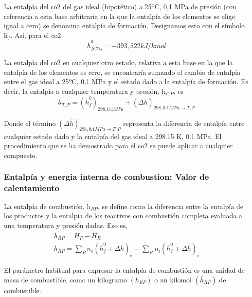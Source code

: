 \par La entalpía del \ac{co2} del gas ideal (hipotético) a 25ºC, 0,1 MPa de presión (con referencia a esta base arbitraria en la que la entalpía de los elementos se elige igual a cero) se denomina entalpía de formación. Designamos esto con el símbolo \=h$_f$. Así, para el \ac{co2}
\begin{equation*}
\bar h^0_{f CO_2} = -393,522 kJ/kmol
\end{equation*}
\par La entalpía del \ac{co2} en cualquier otro estado, relativa a esta base en la que la entalpía de los elementos es cero, se encontraría sumando el cambio de entalpía entre el gas ideal a 25ºC, 0,1 MPa y el estado dado a la entalpía de formación. Es decir, la entalpía a cualquier temperatura y presión, h$_{T, P}$, es
\begin{equation*}
\bar h_{T,P} = (\bar h^0_{f})_{298,0.1MPa} + (\Delta \bar h)_{298,0.1MPa \rightarrow T,P}
\end{equation*}
\par Donde el término $(\Delta \bar h)_{298,0.1MPa \rightarrow T,P}$ representa la diferencia de entalpía entre cualquier estado dado y la entalpía del gas ideal a 298.15 K, 0.1 MPa. El procedimiento que se ha demostrado para el \ac{co2} se puede aplicar a cualquier compuesto.

\subsubsection{Entalpía y energia interna de combustion; Valor de calentamiento}

\par La entalpía de combustión, h$_{RP}$, se define como la diferencia entre la entalpía de los productos y la entalpía de los reactivos con combustión completa evaluada a una temperatura y presión dadas. Eso es,
\begin{equation}
\begin{gathered}
\bar h_{RP} = H_P - H_R \\
\bar h_{RP} = \sum_P n_e(\bar h^0_f + \Delta \bar h)_e - \sum_R n_i(\bar h^0_f + \Delta \bar h)_i
\end{gathered}
\end{equation}

\par El parámetro habitual para expresar la entalpía de combustión es una unidad de masa de combustible, como un kilogramo $(h_{RP})$ o un kilomol $(\bar h_{RP})$ de combustible.

